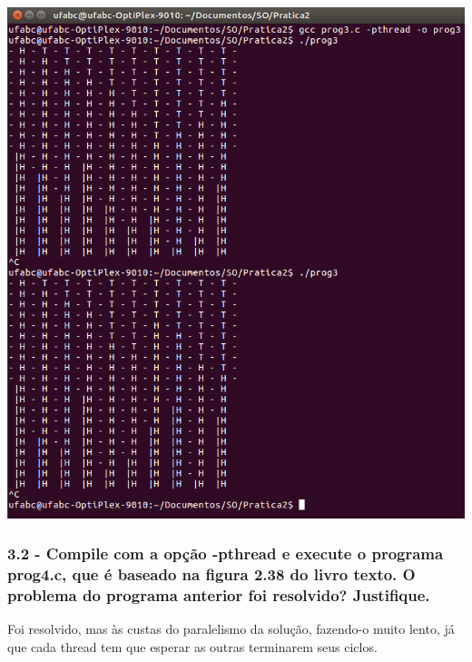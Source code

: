 \vspace{2em}
\begin{minipage}{\textwidth}
    \hspace{-1em}
    \centering
    \includegraphics[trim=0 0 0 0,clip,scale=.4]{pratica2/prog3.png}
    \label{prog4modpng}
    \hspace{1em}
\end{minipage}

\subsubsection{3.2 - Compile com a opção -pthread e execute o programa prog4.c, que é baseado na ﬁgura 2.38 do livro texto. O problema do programa anterior foi resolvido? Justiﬁque.}

Foi resolvido, mas às custas do paralelismo da solução, fazendo-o muito lento, já que cada thread tem que esperar as outras terminarem seus ciclos.

